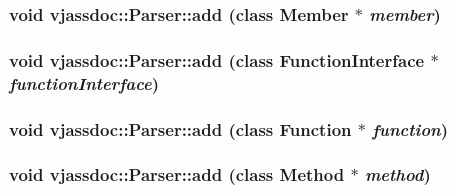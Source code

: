\hypertarget{classvjassdoc_1_1Parser_ddda23536e0ecdd5cca50f5416c261ec}{
\subsubsection{\setlength{\rightskip}{0pt plus 5cm}void vjassdoc::Parser::add (class {\bf Member} $\ast$ {\em member})}}
\label{classvjassdoc_1_1Parser_ddda23536e0ecdd5cca50f5416c261ec}


\hypertarget{classvjassdoc_1_1Parser_ed94ad9b4d34159e1748e3161e677910}{
\subsubsection{\setlength{\rightskip}{0pt plus 5cm}void vjassdoc::Parser::add (class {\bf FunctionInterface} $\ast$ {\em functionInterface})}}
\label{classvjassdoc_1_1Parser_ed94ad9b4d34159e1748e3161e677910}


\hypertarget{classvjassdoc_1_1Parser_226e950395445f3384039c9a36efff6e}{
\subsubsection{\setlength{\rightskip}{0pt plus 5cm}void vjassdoc::Parser::add (class {\bf Function} $\ast$ {\em function})}}
\label{classvjassdoc_1_1Parser_226e950395445f3384039c9a36efff6e}


\hypertarget{classvjassdoc_1_1Parser_a025bb6454379b6c56b26bdaf9e736d8}{
\subsubsection{\setlength{\rightskip}{0pt plus 5cm}void vjassdoc::Parser::add (class {\bf Method} $\ast$ {\em method})}}
\label{classvjassdoc_1_1Parser_a025bb6454379b6c56b26bdaf9e736d8}


